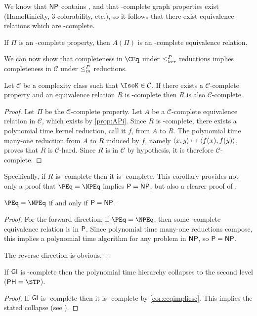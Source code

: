 We know that $\NP$ contains \GI, and that \NP-complete graph properties exist (Hamoltinicity, 3-colorability, etc.), so it follows that there exist equivalence relations which are \NP-complete.

\begin{corollary}
  If $\Pi$ is an \NP-complete property, then $A(\Pi)$ is an \NP-complete equivalence relation.
\end{corollary}

We can now show that completeness in $\CEq$ under $\kr$ reductions implies completeness in $\mathcal{C}$ under $\mor$ reductions.

\begin{corollary}\label{cor:ceqimpliesc}
  Let $\mathcal{C}$ be a complexity class such that $\IsoK\in\mathcal{C}$.
  If there exists a $\mathcal{C}$-complete property and an equivalence relation $R$ is \CEq-complete then $R$ is also $\mathcal{C}$-complete.
\end{corollary}
\begin{proof}
  Let $\Pi$ be the $\mathcal{C}$-complete property.
  Let $A$ be a $\mathcal{C}$-complete equivalence relation in $\mathcal{C}$, which exists by \autoref{prop:APi}.
  Since $R$ is \CEq-complete, there exists a polynomial time kernel reduction, call it $f$, from $A$ to $R$.
  The polynomial time many-one reduction from $A$ to $R$ induced by $f$, namely $\pair{x}{y}\mapsto\pair{f(x)}{f(y)}$, proves that $R$ is $\mathcal{C}$-hard.
  Since $R$ is in $\mathcal{C}$ by hypothesis, it is therefore $\mathcal{C}$-complete.
\end{proof}

Specifically, if $R$ is \NPEq-complete then it is \NP-complete.
This corollary provides not only a proof that $\PEq=\NPEq$ implies $\P=\NP$, but also a clearer proof of \cite[Proposition~8.1]{bcffm}.

\begin{corollary}
  $\PEq=\NPEq$ if and only if $\P=\NP$.
\end{corollary}
\begin{proof}
  For the forward direction, if $\PEq=\NPEq$, then some \NP-complete equivalence relation is in $\P$.
  Since polynomial time many-one reductions compose, this implies a polynomial time algorithm for any problem in $\NP$, so $\P=\NP$.

  The reverse direction is obvious.
\end{proof}

\begin{proposition}
  If $\GI$ is \NPEq-complete then the polynomial time hierarchy collapses to the second level ($\PH=\STP$).
\end{proposition}
\begin{proof}
  If $\GI$ is \NPEq-complete then it is \NP-complete by \autoref{cor:ceqimpliesc}.
  This implies the stated collapse (see \cite{schoning87}).
\end{proof}

